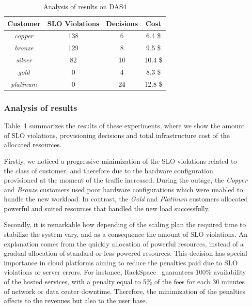 \begin{table}
  {\scriptsize 
\begin{center}
    \begin{tabular}{  | c | c | c | c  |}
    \hline
         \textbf{Customer}  & \textbf{SLO Violations} & \textbf{Decisions}  & \textbf{Cost}   \\ \hline
   \textit{copper}   & 138  &  6 &  6.4 \$ \\ \hline   
   \textit{bronze}  &  129 &   8&  9.5 \$  \\ \hline   
   \textit{silver}  &  82  & 10  &  10.4 \$  \\ \hline   
   \textit{gold}  & 0  &  4  &   8.3 \$    \\ \hline   
\textit{platinum} &  0 & 24 & 12.8 \$  \\ \hline   

 \end{tabular}
\end{center}
\caption{Analysis of results on DAS4}
\label{summaryDAS4}
}
\end{table}

\subsubsection{Analysis of results}

Table~\ref{summaryDAS4} summarizes the results of these experiments, where we show the amount of SLO violations, provisioning decisions and total infrastructure cost of the allocated resources. 

Firstly, we noticed a progressive minimization of the SLO violations related to the class of customer, and therefore due to the hardware configuration provisioned at the moment of the traffic increased. During the outage, the \emph{Copper} and \emph{Bronze} customers used poor hardware configurations which were unabled to handle the new workload. In contrast, the \emph{Gold}  and \emph{Platinum} customers allocated powerful and suited resources that handled the new load successfully.

Secondly, it is remarkable how depending of the scaling plan the required time to stabilize the system vary, and as a consequence the amount of SLO violations. An explanation comes from the quickly allocation of powerful resources, instead of a gradual allocation of standard or less-powered resources. This decision has special importance in cloud platforms aiming to reduce the penalties paid due to SLO violations or server errors. For instance, RackSpace~\cite{rackspace} guarantees 100\% availability of the hosted services, with a penalty equal to 5\% of the fees for each 30 minutes of network or data center downtime. Therefore, the minimization of the penalties affects to the revenues but also to the user base.

